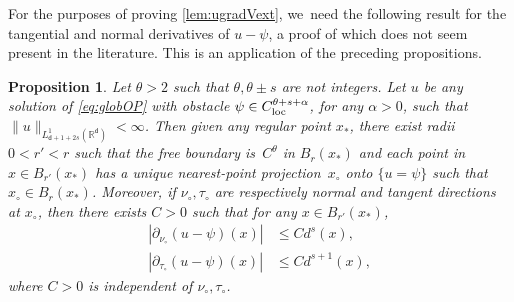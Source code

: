 \documentclass[10pt]{amsart}
\newcommand{\loc}{\textup{loc}}
\theoremstyle{plain}
\newtheorem{prop}[thm]{Proposition}
\theoremstyle{definition}
\newcommand{\R}{{\mathbb{R}}}
\let\p\partial
\renewcommand{\d}{\mathsf{d}}
\begin{document}
For the purposes of proving \cref{lem:ugradVext}, we~need the following result for the tangential and normal derivatives of $u-\psi$, a proof of which does not seem present in the literature. This is an application of the preceding propositions.

\begin{prop}\label{prop:OPnt}
Let $\theta>2$ such that $\theta,\theta\pm s$ are not integers. Let $u$ be any solution of \eqref{eq:globOP} with obstacle $\psi \in C_{\loc}^{\theta+s+\alpha}$, for any $\alpha>0$, such that $\|u\|_{L_{\d+1+2s}^1(\R^\d)}<\infty$. Then given any regular point $x_*$, there exist radii $0<r'<r$ such that the free boundary is~$C^{\theta}$ in $B_r(x_*)$ and each point in $x\in B_{r'}(x_*)$ has a unique nearest-point projection~$x_\circ$ onto $\{u=\psi\}$ such that $x_\circ\in B_{r}(x_*)$. Moreover, if $\nu_\circ,\tau_\circ$ are respectively normal and tangent directions at $x_\circ$, then there exists $C>0$ such that for any $x\in B_{r'}(x_*)$,
\begin{align}
|\p_{\nu_{\circ}}(u-\psi)(x)|&\le C d^s(x), \label{eq:OPntn}\\
|\p_{\tau_\circ}(u-\psi)(x)| &\le Cd^{s+1}(x), \label{eq:OPntt}
\end{align}
where $C>0$ is independent of $\nu_\circ,\tau_\circ$.
\end{prop}
\end{document}
